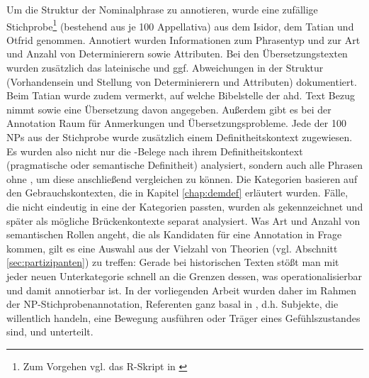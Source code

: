 Um die Struktur der Nominalphrase  zu  annotieren, wurde eine zufällige Stichprobe\footnote{Zum Vorgehen vgl. das R-Skript  in \textcite{HZKYL4_2020}} (bestehend aus je 100 Appellativa) aus dem Isidor, dem Tatian und Otfrid genommen. Annotiert wurden Informationen zum Phrasentyp  und zur Art und Anzahl von Determinierern  sowie Attributen. 
Bei den Übersetzungstexten wurden zusätzlich das lateinische  und ggf. Abweichungen in der Struktur (Vorhandensein und Stellung von Determinierern  und Attributen) dokumentiert. Beim Tatian wurde zudem vermerkt, auf welche Bibelstelle der ahd. Text Bezug nimmt sowie eine Übersetzung davon angegeben. Außerdem gibt es bei der Annotation Raum für Anmerkungen und Übersetzungsprobleme.
Jede der 100 NPs  aus der  Stichprobe wurde zusätzlich einem Definitheitskontext  zugewiesen. Es wurden also nicht nur die -Belege nach ihrem Definitheitskontext  (pragmatische oder semantische Definitheit) analysiert, sondern auch alle Phrasen  ohne , um diese anschließend vergleichen zu können. 
Die Kategorien basieren auf den Gebrauchskontexten, die in Kapitel \ref{chap:demdef} erläutert wurden. Fälle, die nicht eindeutig in eine der Kategorien passten, wurden als  gekennzeichnet und später als mögliche Brückenkontexte separat analysiert. 
Was Art und Anzahl von semantischen Rollen angeht, die als Kandidaten für eine Annotation in Frage kommen, gilt es eine Auswahl aus der Vielzahl von Theorien (vgl. Abschnitt \ref{sec:partizipanten}) zu treffen: Gerade bei historischen Texten stößt man mit jeder neuen Unterkategorie schnell an die Grenzen dessen, was operationalisierbar  und damit annotierbar  ist. In der vorliegenden Arbeit wurden daher im Rahmen der   NP-Stichprobenannotation, Referenten ganz basal in , d.h. Subjekte, die willentlich handeln,  eine Bewegung ausführen oder Träger eines Gefühlszustandes sind,  und  unterteilt.

